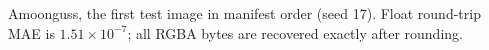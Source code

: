 Amoonguss, the first test image in manifest order (seed 17). Float round-trip MAE is $1.51\times10^{-7}$; all RGBA bytes are recovered exactly after rounding.
